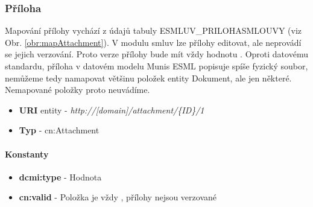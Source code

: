 \subsubsection{Příloha}

Mapování přílohy vychází z údajů tabuly ESMLUV\_PRILOHASMLOUVY (viz Obr. \ref{obr:mapAttachment}). V modulu smluv lze přílohy editovat, ale neprovádí se jejich verzování. Proto verze přílohy bude mít vždy hodnotu . Oproti datovému standardu, příloha v datovém modelu Munis ESML popisuje spíše fyzický soubor, nemůžeme tedy namapovat většinu položek entity Dokument, ale jen některé. Nemapované položky proto neuvádíme.

\begin{itemize}
\item \textbf{URI} entity  - \textit{http://[domain]/attachment/\{ID\}/1}
\item \textbf{Typ} - cn:Attachment
\end{itemize}

\paragraph*{Konstanty}
\begin{itemize}
\item \textbf{dcmi:type} - Hodnota 
\item \textbf{cn:valid} - Položka je vždy , přílohy nejsou verzované
\end{itemize}


